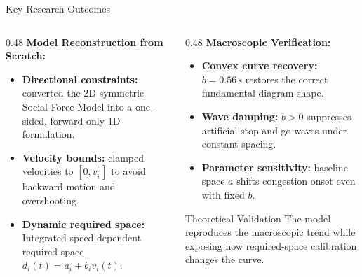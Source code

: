 \documentclass{beamer}
\begin{document}
\begin{frame}{Key Research Outcomes}
\footnotesize
\raggedright

\begin{columns}[T,onlytextwidth]
    \begin{column}{0.48\textwidth}
        \textbf{Model Reconstruction from Scratch:}
        \begin{itemize}
            \item \textbf{Directional constraints:} converted the 2D symmetric Social Force Model into a one-sided, forward-only 1D formulation.
            \item \textbf{Velocity bounds:} clamped velocities to $[0, v_i^0]$ to avoid backward motion and overshooting.
            \item \textbf{Dynamic required space:} Integrated speed-dependent required space $d_i(t) = a_i + b_i v_i(t)$.
        \end{itemize}
    \end{column}

    \begin{column}{0.48\textwidth}
        \textbf{Macroscopic Verification:}
        \begin{itemize}
            \item \textbf{Convex curve recovery:} $b = 0.56\,\mathrm{s}$ restores the correct fundamental-diagram shape.
            \item \textbf{Wave damping:} $b > 0$ suppresses artificial stop-and-go waves under constant spacing.
            \item \textbf{Parameter sensitivity:} baseline space $a$ shifts congestion onset even with fixed $b$.
        \end{itemize}

        \begin{block}{Theoretical Validation}
            The model reproduces the macroscopic trend while exposing how required-space calibration changes the curve.
        \end{block}
    \end{column}
\end{columns}
\end{frame}
\end{document}
